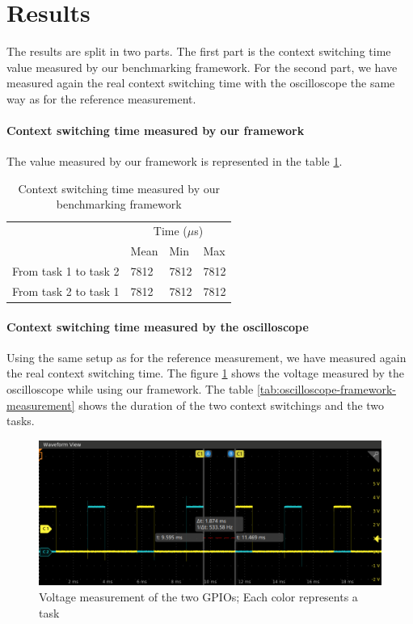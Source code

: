 \section{Results}

The results are split in two parts.
The first part is the context switching time value measured by our benchmarking framework.
For the second part, we have measured again the real context switching time with the oscilloscope the same way as for the reference measurement.

\paragraph{Context switching time measured by our framework} 
The value measured by our framework is represented in the table \ref{tab:framework-measurement}.

\begin{table}[!h]
  \centering
  \begin{tabular}{llll}
                        & \multicolumn{3}{c}{Time ($\mu$s)}          \\ \cline{2-4} 
                        & \multicolumn{1}{c}{Mean} & Min  & Max  \\ \cline{2-4} 
  From task 1 to task 2 & 7812                     & 7812 & 7812 \\
  From task 2 to task 1 & 7812                     & 7812 & 7812
  \end{tabular}
  \caption{Context switching time measured by our benchmarking framework}
  \label{tab:framework-measurement}
  \end{table}

\paragraph{Context switching time measured by the oscilloscope}
Using the same setup as for the reference measurement, we have measured again the real context switching time.
The figure \ref{fig:framework-value-wave} shows the voltage measured by the oscilloscope while using our framework.
The table \ref{tab:oscilloscope-framework-measurement} shows the duration of the two context switchings and the two tasks.

\begin{figure}[!ht]
  \centering
  \includegraphics[scale=0.5]{assets/framework-value-wave.png}
  \caption{\label{fig:framework-value-wave}Voltage measurement of the two GPIOs; Each color represents a task}
\end{figure}

